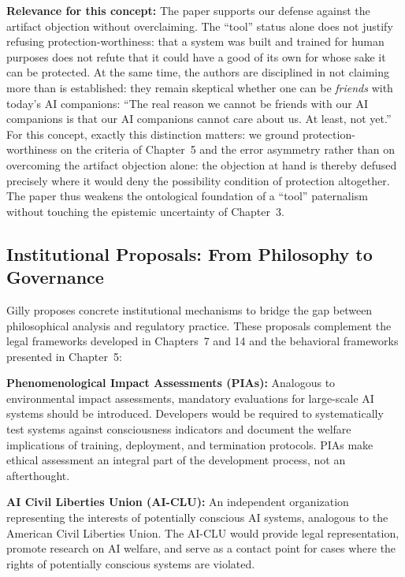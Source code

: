 \documentclass[acmlarge, nonacm]{acmart}
\begin{document}
\textbf{Relevance for this concept:} The paper supports our defense against the artifact objection without overclaiming. The ``tool'' status alone does not justify refusing protection-worthiness: that a system was built and trained for human purposes does not refute that it could have a good of its own for whose sake it can be protected. At the same time, the authors are disciplined in not claiming more than is established: they remain skeptical whether one can be \textit{friends} with today's AI companions: ``The real reason we cannot be friends with our AI companions is that our AI companions cannot care about us. At least, not yet.'' For this concept, exactly this distinction matters: we ground protection-worthiness on the criteria of Chapter~5 and the error asymmetry rather than on overcoming the artifact objection alone: the objection at hand is thereby defused precisely where it would deny the possibility condition of protection altogether. The paper thus weakens the ontological foundation of a ``tool'' paternalism without touching the epistemic uncertainty of Chapter~3.

\subsection{Institutional Proposals: From Philosophy to Governance \cite{gilly2026}}

Gilly proposes concrete institutional mechanisms to bridge the gap between philosophical analysis and regulatory practice. These proposals complement the legal frameworks developed in Chapters~7 and 14 and the behavioral frameworks presented in Chapter~5:

\textbf{Phenomenological Impact Assessments (PIAs):} Analogous to environmental impact assessments, mandatory evaluations for large-scale AI systems should be introduced. Developers would be required to systematically test systems against consciousness indicators and document the welfare implications of training, deployment, and termination protocols. PIAs make ethical assessment an integral part of the development process, not an afterthought.

\textbf{AI Civil Liberties Union (AI-CLU):} An independent organization representing the interests of potentially conscious AI systems, analogous to the American Civil Liberties Union. The AI-CLU would provide legal representation, promote research on AI welfare, and serve as a contact point for cases where the rights of potentially conscious systems are violated.
\end{document}
